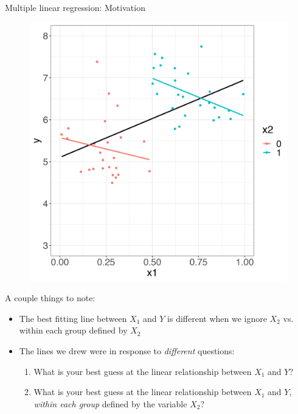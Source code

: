 \documentclass[10pt,t]{beamer}
\begin{document}
\begin{frame}{Multiple linear regression: Motivation}
	\vspace{-0.5cm}
\begin{figure}
	\centering \includegraphics[scale=0.2]{figures/multreg4.png}
\end{figure}

A couple things to note:

\begin{itemize}
	\item The best fitting line between $X_1$ and $Y$ is different when we ignore $X_2$ vs. within each group defined by $X_2$
	\medskip
	
	\item The lines we drew were in response to \textit{different} questions:
	\begin{enumerate}
		\smallskip
		\item What is your best guess at the linear relationship between $X_1$ and $Y$?
		\smallskip
		\item What is your best guess at the linear relationship between $X_1$ and $Y$, \textit{within each group} defined by the variable $X_2$? 
	\end{enumerate}
\end{itemize}

\end{frame}
\end{document}
